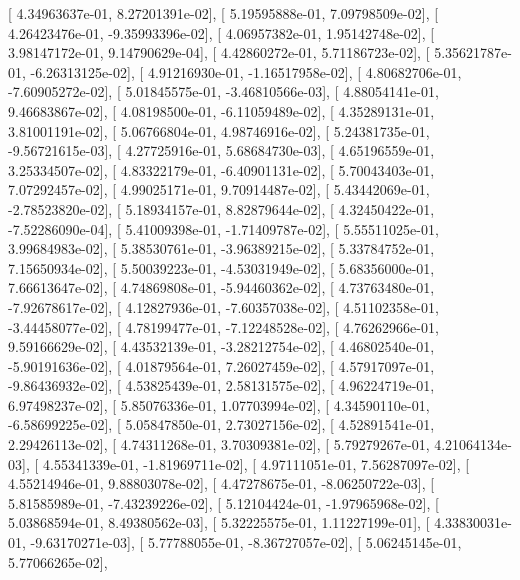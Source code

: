 \documentclass{article}
\begin{document}
       [  4.34963637e-01,   8.27201391e-02],
       [  5.19595888e-01,   7.09798509e-02],
       [  4.26423476e-01,  -9.35993396e-02],
       [  4.06957382e-01,   1.95142748e-02],
       [  3.98147172e-01,   9.14790629e-04],
       [  4.42860272e-01,   5.71186723e-02],
       [  5.35621787e-01,  -6.26313125e-02],
       [  4.91216930e-01,  -1.16517958e-02],
       [  4.80682706e-01,  -7.60905272e-02],
       [  5.01845575e-01,  -3.46810566e-03],
       [  4.88054141e-01,   9.46683867e-02],
       [  4.08198500e-01,  -6.11059489e-02],
       [  4.35289131e-01,   3.81001191e-02],
       [  5.06766804e-01,   4.98746916e-02],
       [  5.24381735e-01,  -9.56721615e-03],
       [  4.27725916e-01,   5.68684730e-03],
       [  4.65196559e-01,   3.25334507e-02],
       [  4.83322179e-01,  -6.40901131e-02],
       [  5.70043403e-01,   7.07292457e-02],
       [  4.99025171e-01,   9.70914487e-02],
       [  5.43442069e-01,  -2.78523820e-02],
       [  5.18934157e-01,   8.82879644e-02],
       [  4.32450422e-01,  -7.52286090e-04],
       [  5.41009398e-01,  -1.71409787e-02],
       [  5.55511025e-01,   3.99684983e-02],
       [  5.38530761e-01,  -3.96389215e-02],
       [  5.33784752e-01,   7.15650934e-02],
       [  5.50039223e-01,  -4.53031949e-02],
       [  5.68356000e-01,   7.66613647e-02],
       [  4.74869808e-01,  -5.94460362e-02],
       [  4.73763480e-01,  -7.92678617e-02],
       [  4.12827936e-01,  -7.60357038e-02],
       [  4.51102358e-01,  -3.44458077e-02],
       [  4.78199477e-01,  -7.12248528e-02],
       [  4.76262966e-01,   9.59166629e-02],
       [  4.43532139e-01,  -3.28212754e-02],
       [  4.46802540e-01,  -5.90191636e-02],
       [  4.01879564e-01,   7.26027459e-02],
       [  4.57917097e-01,  -9.86436932e-02],
       [  4.53825439e-01,   2.58131575e-02],
       [  4.96224719e-01,   6.97498237e-02],
       [  5.85076336e-01,   1.07703994e-02],
       [  4.34590110e-01,  -6.58699225e-02],
       [  5.05847850e-01,   2.73027156e-02],
       [  4.52891541e-01,   2.29426113e-02],
       [  4.74311268e-01,   3.70309381e-02],
       [  5.79279267e-01,   4.21064134e-03],
       [  4.55341339e-01,  -1.81969711e-02],
       [  4.97111051e-01,   7.56287097e-02],
       [  4.55214946e-01,   9.88803078e-02],
       [  4.47278675e-01,  -8.06250722e-03],
       [  5.81585989e-01,  -7.43239226e-02],
       [  5.12104424e-01,  -1.97965968e-02],
       [  5.03868594e-01,   8.49380562e-03],
       [  5.32225575e-01,   1.11227199e-01],
       [  4.33830031e-01,  -9.63170271e-03],
       [  5.77788055e-01,  -8.36727057e-02],
       [  5.06245145e-01,   5.77066265e-02],
\end{document}
